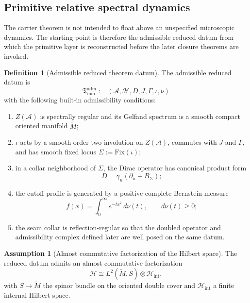 \documentclass[11pt,a4paper]{article}
\theoremstyle{definition}
\newtheorem{definition}[theorem]{Definition}
\newtheorem{assumption}[theorem]{Assumption}
\theoremstyle{remark}
\newcommand{\Seam}{\Sigma}
\newcommand{\inv}{\iota}
\newcommand{\Hint}{\mathcal H_{\mathrm{int}}}
\newcommand{\Tmin}{\mathfrak T_{\mathrm{min}}}
\begin{document}
\subsection{Primitive relative spectral dynamics}

The carrier theorem is not intended to float above an unspecified microscopic dynamics.
The starting point is therefore the admissible reduced datum from which the primitive layer is
reconstructed before the later closure theorems are invoked.

\begin{definition}[Admissible reduced theorem datum]
\label{def:reduced-theorem-datum}
The admissible reduced datum is
\[
\Tmin^{\mathrm{adm}}:=(\mathcal A,\mathcal H,D,J,\Gamma,\inv,\nu)
\]
with the following built-in admissibility conditions:
\begin{enumerate}[label=(\roman*), leftmargin=1.5em, topsep=3pt, itemsep=2pt]
    \item $Z(\mathcal A)$ is spectrally regular and its Gelfand spectrum is a smooth compact oriented manifold $\widetilde M$;
    \item $\inv$ acts by a smooth order-two involution on $Z(\mathcal A)$, commutes with $J$ and $\Gamma$, and has smooth fixed locus $\Seam:=\mathrm{Fix}(\inv)$;
    \item in a collar neighborhood of $\Seam$, the Dirac operator has canonical product form
    \[
    D=\gamma_n(\partial_n+B_\Sigma);
    \]
    \item the cutoff profile is generated by a positive complete-Bernstein measure
    \begin{equation}
    \label{eq:bernstein-test-function}
    f(x)=\int_0^\infty e^{-t x^2}\,d\nu(t),
    \qquad
    d\nu(t)\ge 0;
    \end{equation}
    \item the seam collar is reflection-regular so that the doubled operator and admissibility complex defined later are well posed on the same datum.
\end{enumerate}
\end{definition}

\begin{assumption}[Almost commutative factorization of the Hilbert space]
\label{ass:almost-commutative-factorization}
The reduced datum admits an almost commutative factorization
\[
\mathcal H\cong L^2(\widetilde M,S)\otimes \Hint,
\]
with $S\to\widetilde M$ the spinor bundle on the oriented double cover and $\Hint$ a finite
internal Hilbert space.
\end{assumption}
\end{document}
